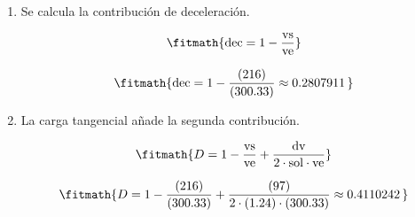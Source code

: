 \begin{enumerate}

\item Se calcula la contribución de deceleración.

\[\fitmath{\mathrm{dec}=1-\frac{\mathrm{vs}}{\mathrm{ve}}}\]

\[\fitmath{\mathrm{dec}=1-\frac{(216)}{(300.33)}\approx 0.2807911\,}\]

\item La carga tangencial añade la segunda contribución.

\[\fitmath{D=1-\frac{\mathrm{vs}}{\mathrm{ve}}+\frac{\mathrm{dv}}{2\cdot \mathrm{sol}\cdot \mathrm{ve}}}\]

\[\fitmath{D=1-\frac{(216)}{(300.33)}+\frac{(97)}{2\cdot (1.24)\cdot (300.33)}\approx 0.4110242\,}\]

\end{enumerate}
